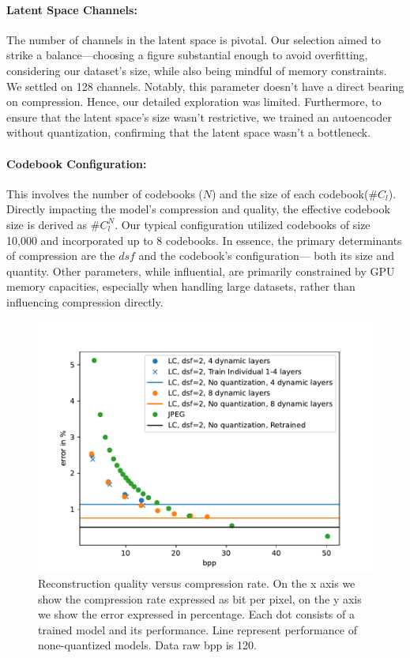 \documentclass[runningheads]{llncs}
\begin{document}
\paragraph{Latent Space Channels:} The number of channels in the latent space is pivotal. Our selection aimed to 
strike a balance—choosing a figure substantial enough to avoid overfitting, considering our dataset's 
size, while also being mindful of memory constraints. We settled on 128 channels. Notably, this 
parameter doesn't have a direct bearing on compression. Hence, our detailed exploration was limited. 
Furthermore, to ensure that the latent space's size wasn't restrictive, we trained an autoencoder 
without quantization, confirming that the latent space wasn't a bottleneck. 
\paragraph{Codebook Configuration:} This involves the number of codebooks ($N$) and the size of each 
codebook($\#C_l$). Directly impacting the model's compression and quality, the effective codebook size 
is derived as $\#C_l^N$. Our typical configuration utilized codebooks of size 10,000 and incorporated up to 
8 codebooks. 
In essence, the primary determinants of compression are the $dsf$ and the codebook’s configuration—
both its size and quantity. Other parameters, while influential, are primarily constrained by GPU 
memory capacities, especially when handling large datasets, rather than influencing compression 
directly.

\begin{figure}
    \includegraphics[width=\textwidth]{figures/loss.pdf}
    \caption{Reconstruction quality versus compression rate. 
On the x axis we show the compression rate expressed as bit per pixel, on the y axis we show the error expressed in 
percentage. Each dot consists of a trained model and its performance. Line represent performance of none-quantized 
models. Data raw bpp is 120.}
\label{fig-loss}
\end{figure}
\end{document}
